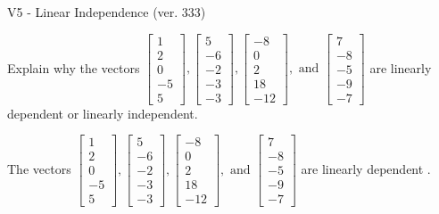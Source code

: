 \begin{exercise}
  \begin{exerciseTitle}V5 - Linear Independence (ver. 333)\end{exerciseTitle}
  \begin{exerciseStatement}
    Explain why the vectors \(\left[\begin{array}{r}
1 \\
2 \\
0 \\
-5 \\
5
\end{array}\right] , \left[\begin{array}{r}
5 \\
-6 \\
-2 \\
-3 \\
-3
\end{array}\right] , \left[\begin{array}{r}
-8 \\
0 \\
2 \\
18 \\
-12
\end{array}\right] , \text{ and } \left[\begin{array}{r}
7 \\
-8 \\
-5 \\
-9 \\
-7
\end{array}\right]\) are linearly dependent or linearly independent.	


  \end{exerciseStatement}
  \begin{exerciseAnswer}
   The vectors \(\left[\begin{array}{r}
1 \\
2 \\
0 \\
-5 \\
5
\end{array}\right] , \left[\begin{array}{r}
5 \\
-6 \\
-2 \\
-3 \\
-3
\end{array}\right] , \left[\begin{array}{r}
-8 \\
0 \\
2 \\
18 \\
-12
\end{array}\right] , \text{ and } \left[\begin{array}{r}
7 \\
-8 \\
-5 \\
-9 \\
-7
\end{array}\right]\) are 
  	 linearly dependent  .
  


  \end{exerciseAnswer}
\end{exercise}